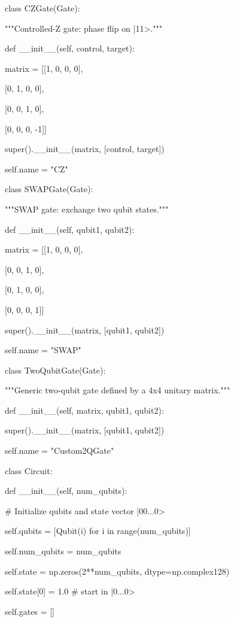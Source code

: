 \documentclass[%
oneside,                 %
final,                   %
10pt]{article}
\begin{document}
class CZGate(Gate):

    """Controlled-Z gate: phase flip on |11>."""

    def __init__(self, control, target):

        matrix = [[1, 0, 0, 0],

                  [0, 1, 0, 0],

                  [0, 0, 1, 0],

                  [0, 0, 0, -1]]

        super().__init__(matrix, [control, target])

        self.name = "CZ"



class SWAPGate(Gate):

    """SWAP gate: exchange two qubit states."""

    def __init__(self, qubit1, qubit2):

        matrix = [[1, 0, 0, 0],

                  [0, 0, 1, 0],

                  [0, 1, 0, 0],

                  [0, 0, 0, 1]]

        super().__init__(matrix, [qubit1, qubit2])

        self.name = "SWAP"



class TwoQubitGate(Gate):

    """Generic two-qubit gate defined by a 4x4 unitary matrix."""

    def __init__(self, matrix, qubit1, qubit2):

        super().__init__(matrix, [qubit1, qubit2])

        self.name = "Custom2QGate"



class Circuit:

    def __init__(self, num_qubits):

        # Initialize qubits and state vector |00...0>

        self.qubits = [Qubit(i) for i in range(num_qubits)]

        self.num_qubits = num_qubits

        self.state = np.zeros(2**num_qubits, dtype=np.complex128)

        self.state[0] = 1.0  # start in |0...0>

        self.gates = []
\end{document}
